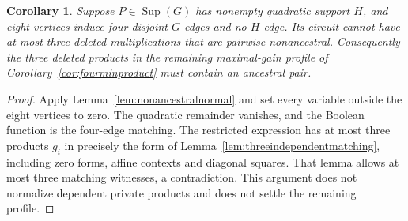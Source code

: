 \documentclass[11pt]{article}
\newcommand{\Sup}{\operatorname{Sup}}
\newtheorem{corollary}[theorem]{Corollary}
\theoremstyle{definition}
\theoremstyle{remark}
\begin{document}
\begin{corollary}\label{cor:nonancestralmatching}
Suppose $P\in\Sup(G)$ has nonempty quadratic support $H$, and eight vertices induce four disjoint $G$-edges and no $H$-edge. Its circuit cannot have at most three deleted multiplications that are pairwise nonancestral. Consequently the three deleted products in the remaining maximal-gain profile of Corollary~\ref{cor:fourminproduct} must contain an ancestral pair.
\end{corollary}
\begin{proof}
Apply Lemma~\ref{lem:nonancestralnormal} and set every variable outside the eight vertices to zero. The quadratic remainder vanishes, and the Boolean function is the four-edge matching. The restricted expression has at most three products $g_i$ in precisely the form of Lemma~\ref{lem:threeindependentmatching}, including zero forms, affine contexts and diagonal squares. That lemma allows at most three matching witnesses, a contradiction. This argument does not normalize dependent private products and does not settle the remaining profile.
\end{proof}
\end{document}
